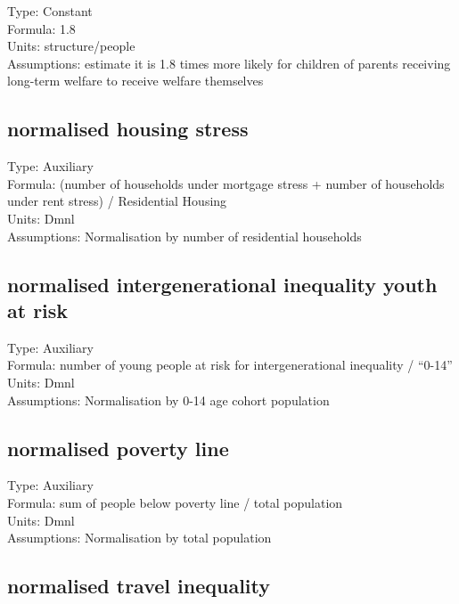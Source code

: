 \documentclass[
  11pt,
]{book}
\begin{document}
Type: Constant\\
Formula: 1.8\\
Units: structure/people\\
Assumptions: \citet{cobb-clarke_intergenerational_2017} estimate it is 1.8 times more likely for children of parents receiving long-term welfare to receive welfare themselves

\hypertarget{normalised-housing-stress}{%
\subsection{normalised housing stress}\label{normalised-housing-stress}}

Type: Auxiliary\\
Formula: (number of households under mortgage stress + number of households under rent stress) / Residential Housing\\
Units: Dmnl\\
Assumptions: Normalisation by number of residential households

\hypertarget{normalised-intergenerational-inequality-youth-at-risk}{%
\subsection{normalised intergenerational inequality youth at risk}\label{normalised-intergenerational-inequality-youth-at-risk}}

Type: Auxiliary\\
Formula: number of young people at risk for intergenerational inequality / ``0-14''\\
Units: Dmnl\\
Assumptions: Normalisation by 0-14 age cohort population

\hypertarget{normalised-poverty-line}{%
\subsection{normalised poverty line}\label{normalised-poverty-line}}

Type: Auxiliary\\
Formula: sum of people below poverty line / total population\\
Units: Dmnl\\
Assumptions: Normalisation by total population

\hypertarget{normalised-travel-inequality}{%
\subsection{normalised travel inequality}\label{normalised-travel-inequality}}
\end{document}
